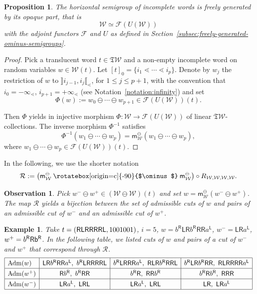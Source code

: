\documentclass[pdftex]{sigma}
\newcommand\overt{\mathbin{\text{\rotatebox[origin=c]{-90}{$\ominus$}}}}
\newcommand{\stdl}{\lessdot}
\newcommand{\SWc}{{\mathfrak{T}\mathcal{W}}}
\newcommand\IWc{\mathcal{W}}
\newcommand\mS{\mathsf{m}^{\ominus}_{\IWc}}
\newcommand\LL{{\mathsf{L}}}
\newcommand\RR{{\mathsf{R}}}
\numberwithin{equation}{section}
\newtheorem{Proposition}[Theorem]{Proposition}
\newtheorem{Observation}[Theorem]{Observation}
\newtheorem{Example}[Theorem]{Example}
\begin{document}
\begin{Proposition}\label{prop:freealgebra} The horizontal semigroup of incomplete words is freely generated by its opaque part, that is
	\begin{equation*}
		\IWc \simeq \mathcal{F}(U(\IWc))
	\end{equation*}
with the adjoint functors $\mathcal F$ and $U$ as defined in Section~{\rm \ref{subsec:freely-generated-ominus-semigroups}}.
\end{Proposition}
\begin{proof}Pick a translucent word $t \in \SWc$ and a non-empty incomplete word on random variables $w \in \IWc(t)$. Let $[t]_0 = \{i_1 \stdl \cdots \stdl i_p\}$.
	Denote by $w_j$ the restriction of $w$ to $\rrbracket i_{j-1},i_j\llbracket_\stdl$, for $1\leq j \leq p+1$, with the convention that $i_0=-\infty_\stdl$, $i_{p+1}=+\infty_\stdl$ (see Notation~\ref{notation:infinity}) and set
	\[\Phi(w) := w_0\ominus \cdots \ominus w_{p+1} \in \mathcal{F}(U(\IWc))(t).\]

	Then $\Phi$ yields in injective morphism $\Phi\colon \IWc\to\mathcal{F}(U(\IWc))$ of linear $\SWc$-collections. The inverse morphism $\Phi^{-1}$ satisfies
	\begin{equation*}
		\Phi^{-1}(w_1\ominus \cdots \ominus w_p) = \mS(w_1\ominus \cdots \ominus w_p),
	\end{equation*}
	where $w_1 \ominus \cdots \ominus w_p \in \mathcal{F}(U(\IWc))(t)$.
\end{proof}

In the following, we use the shorter notation
\[
\mathcal{R} := \big(\mS \overt \mS\big) \circ R_{\IWc,\IWc,\IWc,\IWc}.
\]
\begin{Observation}
 Pick $w^-\ominus w^+\in (\IWc\ominus \IWc)(t)$ and set $w = \mS(w^{-}\ominus w^{+})$.
 The map $\mathcal{R}$ yields a \emph{bijection} between the set of admissible cuts of $w$ and pairs of an admissible cut of $w^-$ and an admissible cut of $w^+$.
\end{Observation}

\begin{Example}
	Take $t=({\sf RLRR{R}RL},1001001)$, $i=5$, $w=b^{\RR} \LL \RR b^{\RR} {\RR}\RR a^{\LL}$, $w^- = \LL\RR a^{\LL}$, $w^{+}={b^{\RR}{\sf Rb^{\RR}}}$. In the following table, we listed cuts of $w$ and pairs of a cut of $w^-$ and $w^+$ that correspond through $\mathcal{R}$.
$$\renewcommand{\arraystretch}{1.3}
		\begin{array}{|l|c|c|c|}
			\hline
			 {\rm Adm}(w) & \LL \RR b^{\RR} \RR \RR a^{\LL}, \ b^{\RR} \LL\RR\RR\RR\RR\LL & b^{\RR} \LL\RR\RR\RR a^{\LL}, \ \RR \LL\RR b^{\RR}\RR\RR\LL & b^{\RR}\LL\RR b^{\RR}\RR\RR, \ \RR\LL\RR\RR\RR\RR a^{\LL} \\
			\hline
			 {\rm Adm}(w^{+}) & \RR b^{\RR}, \ b^{\RR} \RR \RR & b^{\RR} \RR, \ \RR \RR b^{\RR} & b^{\RR} \RR b^{\RR}, \ \RR\RR\RR \\
			\hline
			 {\rm Adm}(w^-) & \LL\RR a^{\LL}, \ \LL\RR\LL & \LL\RR a^{\LL}, \ \LL\RR\LL & \LL\RR, \ \LL\RR a^{\LL} \\
			\hline
		\end{array}
$$
\end{Example}
\end{document}
